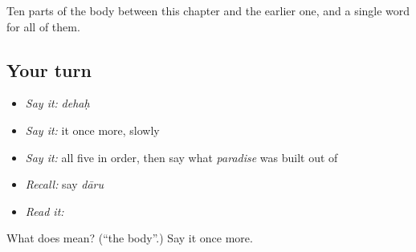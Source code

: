 \begin{grammarlens}[title={What you've built}]
Ten parts of the body between this chapter and the earlier one, and a single word for all of them.
\end{grammarlens}

\subsection*{Your turn}
\begin{itemize}
\raggedright
  \item \emph{Say it:} \emph{dehaḥ}
  \item \emph{Say it:} it once more, slowly
  \item \emph{Say it:} all five in order, then say what \emph{paradise} was built out of
  \item \emph{Recall:} say \emph{dāru}
  \item \emph{Read it:} \textbf{}
\end{itemize}

\begin{tcolorbox}[breakable,colback=teal!4,colframe=teal!35!black,title={Before you move on}]
What does  mean? (\textquotedblleft{}the body\textquotedblright{}.) Say it once more.
\end{tcolorbox}
